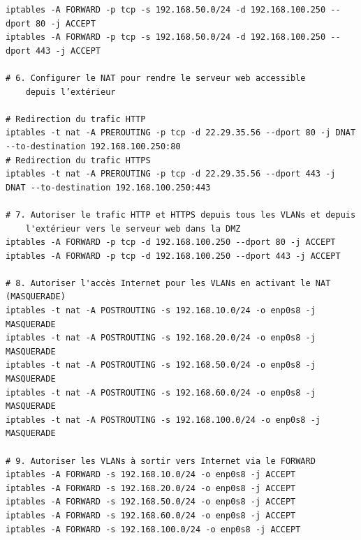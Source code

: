 \documentclass[a4paper,12pt]{report}
\begin{document}
\begin{verbatim}
iptables -A FORWARD -p tcp -s 192.168.50.0/24 -d 192.168.100.250 --dport 80 -j ACCEPT
iptables -A FORWARD -p tcp -s 192.168.50.0/24 -d 192.168.100.250 --dport 443 -j ACCEPT

# 6. Configurer le NAT pour rendre le serveur web accessible 
    depuis l’extérieur

# Redirection du trafic HTTP
iptables -t nat -A PREROUTING -p tcp -d 22.29.35.56 --dport 80 -j DNAT --to-destination 192.168.100.250:80
# Redirection du trafic HTTPS
iptables -t nat -A PREROUTING -p tcp -d 22.29.35.56 --dport 443 -j DNAT --to-destination 192.168.100.250:443

# 7. Autoriser le trafic HTTP et HTTPS depuis tous les VLANs et depuis 
    l'extérieur vers le serveur web dans la DMZ
iptables -A FORWARD -p tcp -d 192.168.100.250 --dport 80 -j ACCEPT
iptables -A FORWARD -p tcp -d 192.168.100.250 --dport 443 -j ACCEPT

# 8. Autoriser l'accès Internet pour les VLANs en activant le NAT (MASQUERADE)
iptables -t nat -A POSTROUTING -s 192.168.10.0/24 -o enp0s8 -j MASQUERADE 
iptables -t nat -A POSTROUTING -s 192.168.20.0/24 -o enp0s8 -j MASQUERADE 
iptables -t nat -A POSTROUTING -s 192.168.50.0/24 -o enp0s8 -j MASQUERADE 
iptables -t nat -A POSTROUTING -s 192.168.60.0/24 -o enp0s8 -j MASQUERADE 
iptables -t nat -A POSTROUTING -s 192.168.100.0/24 -o enp0s8 -j MASQUERADE 

# 9. Autoriser les VLANs à sortir vers Internet via le FORWARD 
iptables -A FORWARD -s 192.168.10.0/24 -o enp0s8 -j ACCEPT 
iptables -A FORWARD -s 192.168.20.0/24 -o enp0s8 -j ACCEPT 
iptables -A FORWARD -s 192.168.50.0/24 -o enp0s8 -j ACCEPT 
iptables -A FORWARD -s 192.168.60.0/24 -o enp0s8 -j ACCEPT 
iptables -A FORWARD -s 192.168.100.0/24 -o enp0s8 -j ACCEPT
            \end{verbatim}
\end{document}
